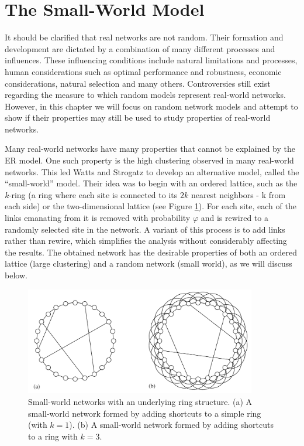 
\section{The Small-World Model}

It should be clarified that real networks are not random. Their formation and development are dictated by a combination of many different processes and influences. These influencing conditions include natural limitations and processes, human considerations such as optimal performance and robustness, economic considerations, natural selection and many others. Controversies still exist regarding the measure to which random models represent real-world networks. However, in this chapter we will focus on random network models and attempt to show if their properties may still be used to study properties of real-world networks. \s

\noindent Many real-world networks have many properties that cannot be explained by the ER model. One such property is the high clustering observed in many real-world networks. This led Watts and Strogatz to develop an alternative model, called the “small-world” model. Their idea was to begin with an ordered lattice, such as the \emph{k-}ring (a ring where each site is connected to its $2k$ nearest neighbors - k from each side) or the two-dimensional lattice (see Figure \ref{fig:fig1}). For each site, each of the links emanating from it is removed with probability $\varphi$ and is rewired to a randomly selected site in the network. A variant of this process is to add links rather than rewire, which simplifies the analysis without considerably affecting the results. The obtained network has the desirable properties of both an ordered lattice (large clustering) and a random network (small world), as we will discuss below.

\begin{figure}[h]
    \centering
    \includegraphics[width=0.9\textwidth]{figures/7olKNVY.png}
    \caption{Small-world networks with an underlying ring structure. (a) A small-world network formed by adding shortcuts to a simple ring (with $k = 1$). (b) A small-world network formed by adding shortcuts to a ring with $k = 3$.}
    \label{fig:fig1}
\end{figure}

